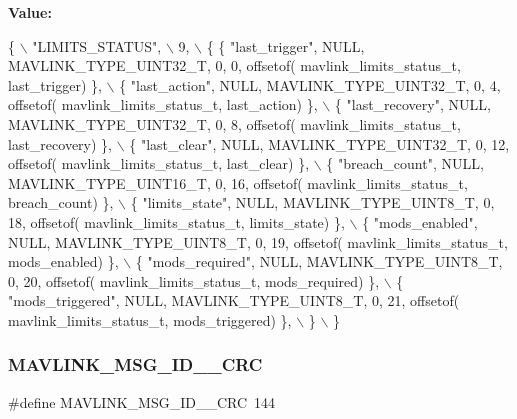 {\bfseries Value\+:}
\begin{DoxyCode}
\{ \(\backslash\)
    \textcolor{stringliteral}{"LIMITS\_STATUS"}, \(\backslash\)
    9, \(\backslash\)
    \{  \{ \textcolor{stringliteral}{"last\_trigger"}, NULL, MAVLINK_TYPE_UINT32_T, 0, 0, offsetof(
      mavlink_limits_status_t, last\_trigger) \}, \(\backslash\)
         \{ \textcolor{stringliteral}{"last\_action"}, NULL, MAVLINK_TYPE_UINT32_T, 0, 4, offsetof(
      mavlink_limits_status_t, last\_action) \}, \(\backslash\)
         \{ \textcolor{stringliteral}{"last\_recovery"}, NULL, MAVLINK_TYPE_UINT32_T, 0, 8, offsetof(
      mavlink_limits_status_t, last\_recovery) \}, \(\backslash\)
         \{ \textcolor{stringliteral}{"last\_clear"}, NULL, MAVLINK_TYPE_UINT32_T, 0, 12, offsetof(
      mavlink_limits_status_t, last\_clear) \}, \(\backslash\)
         \{ \textcolor{stringliteral}{"breach\_count"}, NULL, MAVLINK_TYPE_UINT16_T, 0, 16, offsetof(
      mavlink_limits_status_t, breach\_count) \}, \(\backslash\)
         \{ \textcolor{stringliteral}{"limits\_state"}, NULL, MAVLINK_TYPE_UINT8_T, 0, 18, offsetof(
      mavlink_limits_status_t, limits\_state) \}, \(\backslash\)
         \{ \textcolor{stringliteral}{"mods\_enabled"}, NULL, MAVLINK_TYPE_UINT8_T, 0, 19, offsetof(
      mavlink_limits_status_t, mods\_enabled) \}, \(\backslash\)
         \{ \textcolor{stringliteral}{"mods\_required"}, NULL, MAVLINK_TYPE_UINT8_T, 0, 20, offsetof(
      mavlink_limits_status_t, mods\_required) \}, \(\backslash\)
         \{ \textcolor{stringliteral}{"mods\_triggered"}, NULL, MAVLINK_TYPE_UINT8_T, 0, 21, offsetof(
      mavlink_limits_status_t, mods\_triggered) \}, \(\backslash\)
         \} \(\backslash\)
\}
\end{DoxyCode}
\mbox{\label{mavlink__msg__limits__status_8h_a5c2f63415dc0748286351d4337781641}} 
\subsubsection{M\+A\+V\+L\+I\+N\+K\+\_\+\+M\+S\+G\+\_\+\+I\+D\+\_\+\_\+\+C\+RC}
{\footnotesize\ttfamily \#define M\+A\+V\+L\+I\+N\+K\+\_\+\+M\+S\+G\+\_\+\+I\+D\+\_\+\_\+\+C\+RC~144}


